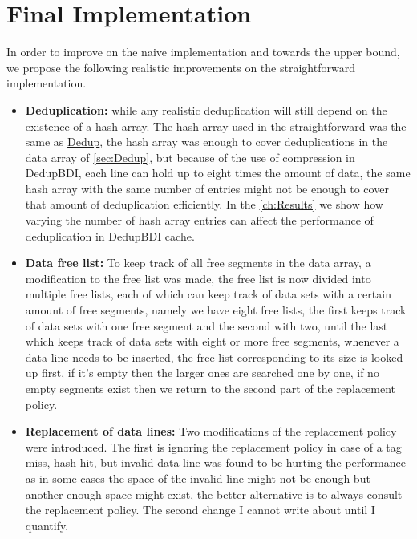 \section{Final Implementation}
\label{sec:Final Implementation}
In order to improve on the naive implementation and towards the upper bound, we propose the following realistic improvements on the straightforward implementation.
\begin{itemize}
    \item \textbf{Deduplication:} while any realistic deduplication will still depend on the existence of a hash array. The hash array used in the straightforward was the same as \hyperref[sssec:DedupHash]{Dedup}, the hash array was enough to cover deduplications in the data array of \ref{sec:Dedup}, but because of the use of compression in DedupBDI, each line can hold up to eight times the amount of data, the same hash array with the same number of entries might not be enough to cover that amount of deduplication efficiently. In the \ref{ch:Results} we show how varying the number of hash array entries can affect the performance of deduplication in DedupBDI cache.
    \item \textbf{Data free list:} To keep track of all free segments in the data array, a modification to the free list was made, the free list is now divided into multiple free lists, each of which can keep track of data sets with a certain amount of free segments, namely we have eight free lists, the first keeps track of data sets with one free segment and the second with two, until the last which keeps track of data sets with eight or more free segments, whenever a data line needs to be inserted, the free list corresponding to its size is looked up first, if it's empty then the larger ones are searched one by one, if no empty segments exist then we return to the second part of the replacement policy.
    \item \textbf{Replacement of data lines:} Two modifications of the replacement policy were introduced. The first is ignoring the replacement policy in case of a tag miss, hash hit, but invalid data line was found to be hurting the performance as in some cases the space of the invalid line might not be enough but another enough space might exist, the better alternative is to always consult the replacement policy. The second change I cannot write about until I quantify.
\end{itemize}

